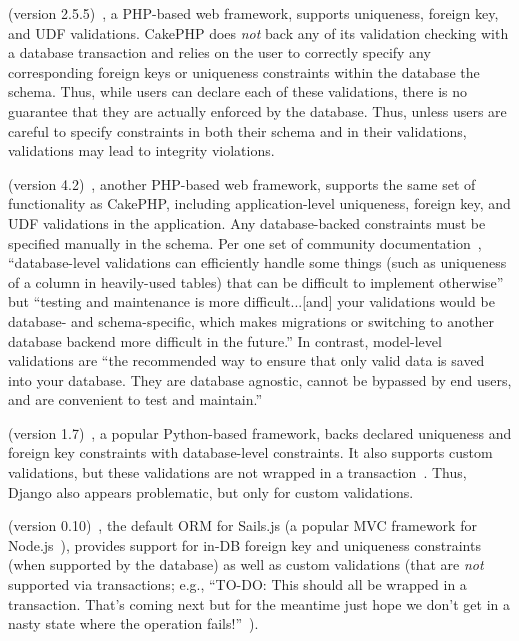  (version 2.5.5)~\cite{code-cakephp}, a PHP-based web
framework, supports uniqueness, foreign key, and UDF
validations. CakePHP does \textit{not} back any of its validation
checking with a database transaction and relies on the user to
correctly specify any corresponding foreign keys or uniqueness
constraints within the database the schema. Thus, while users can
declare each of these validations, there is no guarantee that they are
actually enforced by the database. Thus, unless users are careful to
specify constraints in both their schema and in their validations,
validations may lead to integrity violations.

 (version 4.2)~\cite{code-laravel}, another PHP-based web
framework, supports the same set of functionality as CakePHP,
including application-level uniqueness, foreign key, and UDF
validations in the application. Any database-backed constraints must
be specified manually in the schema. Per one set of community
documentation~\cite{laravel-book}, ``database-level validations can
efficiently handle some things (such as uniqueness of a column in
heavily-used tables) that can be difficult to implement otherwise''
but ``testing and maintenance is more difficult...[and] your
validations would be database- and schema-specific, which makes
migrations or switching to another database backend more difficult in
the future.'' In contrast, model-level validations are ``the
recommended way to ensure that only valid data is saved into your
database. They are database agnostic, cannot be bypassed by end users,
and are convenient to test and maintain.'' 

 (version 1.7)~\cite{code-django}, a popular Python-based
framework, backs declared uniqueness and foreign key constraints with
database-level constraints. It also supports custom validations, but
these validations are not wrapped in a
transaction~\cite{code-django-constraints}. Thus, Django also appears
problematic, but only for custom validations.

 (version 0.10)~\cite{code-waterline}, the default ORM
for Sails.js (a popular MVC framework for Node.js~\cite{code-sails}),
provides support for in-DB foreign key and uniqueness constraints
(when supported by the database) as well as custom validations (that
are \textit{not} supported via transactions; e.g., ``TO-DO: This
should all be wrapped in a transaction. That's coming next but for the
meantime just hope we don't get in a nasty state where the operation
fails!''~\cite{code-waterline-txn}).

